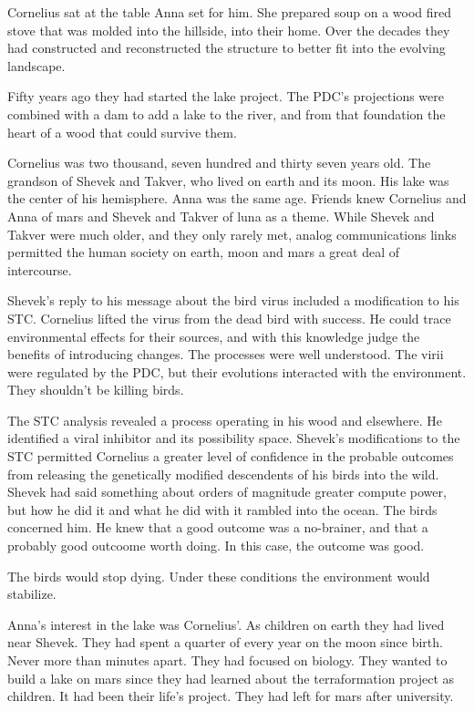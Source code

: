 Cornelius sat at the table Anna set for him.  She prepared soup on a
wood fired stove that was molded into the hillside, into their home.
Over the decades they had constructed and reconstructed the structure
to better fit into the evolving landscape.  

Fifty years ago they had started the lake project.  The PDC's projections
were combined with a dam to add a lake to the river, and from that
foundation the heart of a wood that could survive them.

\bigskip

Cornelius was two thousand, seven hundred and thirty seven years old.
The grandson of Shevek and Takver, who lived on earth and its moon.
His lake was the center of his hemisphere.  Anna was the same age.
Friends knew Cornelius and Anna of mars and Shevek and Takver of luna
as a theme.  While Shevek and Takver were much older, and they only
rarely met, analog communications links permitted the human society on
earth, moon and mars a great deal of intercourse.

\bigskip

Shevek's reply to his message about the bird virus included a
modification to his STC.  Cornelius lifted the virus from the dead
bird with success.  He could trace environmental effects for their
sources, and with this knowledge judge the benefits of introducing
changes.  The processes were well understood.  The virii were
regulated by the PDC, but their evolutions interacted with the
environment.  They shouldn't be killing birds.

The STC analysis revealed a process operating in his wood and
elsewhere.  He identified a viral inhibitor and its possibility space.
Shevek's modifications to the STC permitted Cornelius a greater level
of confidence in the probable outcomes from releasing the genetically
modified descendents of his birds into the wild.  Shevek had said
something about orders of magnitude greater compute power, but how he
did it and what he did with it rambled into the ocean.  The birds
concerned him.  He knew that a good outcome was a no-brainer, and that
a probably good outcoome worth doing.  In this case, the outcome was
good.  

The birds would stop dying.  Under these conditions the environment
would stabilize.

Anna's interest in the lake was Cornelius'.  As children on earth they
had lived near Shevek.  They had spent a quarter of every year on the
moon since birth.  Never more than minutes apart.  They had focused on
biology.  They wanted to build a lake on mars since they had learned
about the terraformation project as children.  It had been their
life's project.  They had left for mars after university.

